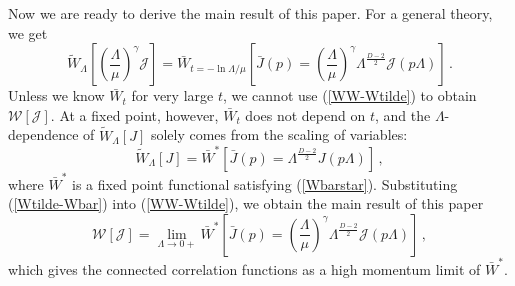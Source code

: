 \documentclass[aps,prd,preprint,groupedaddress,preprintnumbers,longbibliography]{revtex4-1}
\newcommand{\WW}{\mathcal{W}}
\newcommand{\JJ}{\mathcal{J}}
\begin{document}
Now we are ready to derive the main result of this paper.  For a
general theory, we get
\begin{equation}
\tilde{W}_\Lambda \left[ \left(\frac{\Lambda}{\mu}\right)^\gamma \JJ
\right] =  \bar{W}_{t = - \ln \Lambda/\mu} \left[ \bar{J} (p) =
  \left(\frac{\Lambda}{\mu}\right)^\gamma \Lambda^{\frac{D-2}{2}} \JJ
  (p \Lambda) \right]\,.
\end{equation}
Unless we know $\bar{W}_t$ for very large $t$, we cannot use
(\ref{WW-Wtilde}) to obtain $\WW [\JJ]$.  At a fixed point, however,
$\bar{W}_t$ does not depend on $t$, and the $\Lambda$-dependence of
$\tilde{W}_\Lambda [J]$ solely comes from the scaling of variables:
\begin{equation}
\tilde{W}_\Lambda [J] = \bar{W}^* \left[\bar{J} (p) =
  \Lambda^{\frac{D-2}{2}} J (p \Lambda)\right]\,,
\label{Wtilde-Wbar}
\end{equation}
where $\bar{W}^*$ is a fixed point functional satisfying
(\ref{Wbarstar}).  Substituting (\ref{Wtilde-Wbar}) into
(\ref{WW-Wtilde}), we obtain the main result of this paper
\begin{equation}
\WW [\JJ] = \lim_{\Lambda \to 0+} \bar{W}^* \left[ \bar{J} (p) = 
  \left(\frac{\Lambda}{\mu}\right)^\gamma \Lambda^{\frac{D-2}{2}} \JJ
  (p\Lambda) \right]\,, \label{mainresult}
\end{equation}
which gives the connected correlation functions as a high momentum
limit of $\bar{W}^*$.
\end{document}
